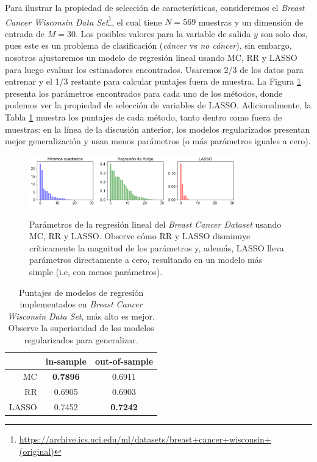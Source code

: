 Para ilustrar la propiedad de selección de características, consideremos el \emph{Breast Cancer Wisconsin Data Set}\footnote{\url{https://archive.ics.uci.edu/ml/datasets/breast+cancer+wisconsin+(original)}}, el cual tiene $N=569$ muestras y un dimensión de entrada de $M=30$. Los posibles valores para la variable de salida $y$ son solo dos, pues este es un problema de clasificación (\emph{cáncer} vs \emph{no cáncer}), sin embargo, nosotros ajustaremos un modelo de regresión lineal usando MC, RR y LASSO para luego evaluar los estimadores encontrados. Usaremos 2/3 de los datos para entrenar y el 1/3 restante para calcular puntajes fuera de muestra. La Figura \ref{fig:MC_RR_LASSO_breastcancer} presenta los parámetros encontrados para cada uno de los métodos, donde podemos ver la propiedad de selección de variables de LASSO. Adicionalmente, la Tabla \ref{tab:breastMC_RR_LASSO} muestra los puntajes de cada método, tanto dentro como fuera de muestras: en la línea de la discusión anterior, los modelos regularizados presentan mejor generalización y usan menos parámetros (o más parámetros iguales a cero). 

\begin{figure}[H]
	\centering
	\includegraphics[width=0.8\textwidth]{img/cap2_OLS_RR_LASSO.pdf}\\
	\caption{Parámetros de la regresión lineal del \emph{Breast Cancer Dataset} usando MC, RR y LASSO. Observe cómo RR y LASSO disminuye críticamente la magnitud de los parámetros y, además, LASSO lleva parámetros directamente a cero, resultando en un modelo más simple (i.e, con menos parámetros).}
	\label{fig:MC_RR_LASSO_breastcancer}  
\end{figure}

\begin{table}[h]
\centering
	\begin{tabular}{ r|c|c } 
		 & in-sample & out-of-sample \\
		\hline
		MC & \textbf{0.7896} & 0.6911 \\ 
		RR & 0.6905 & 0.6903 \\ 
		LASSO & 0.7452 & \textbf{0.7242}
	\end{tabular}
	\caption{Puntajes de modelos de regresión implementados en \emph{Breast Cancer Wisconsin Data Set}, más alto es mejor. Observe la superioridad de los modelos regularizados para generalizar.}
	\label{tab:breastMC_RR_LASSO}
\end{table}

